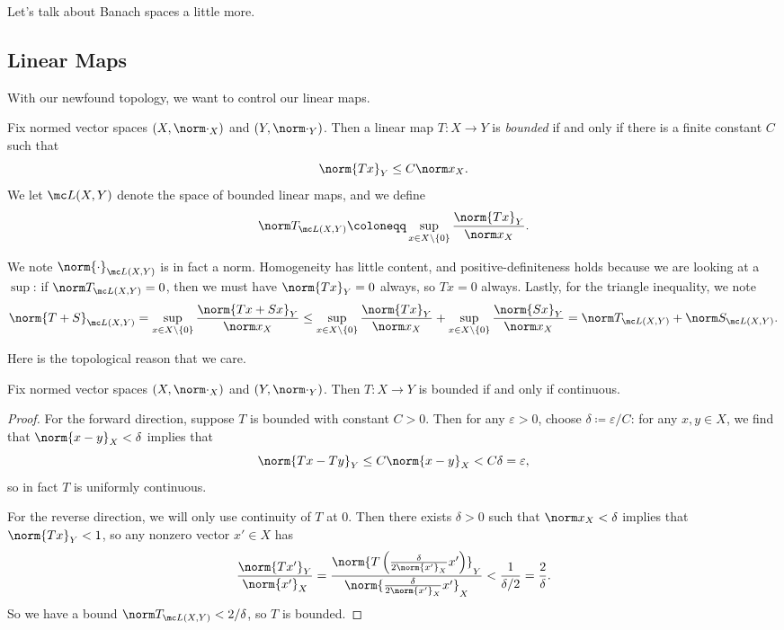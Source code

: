 \documentclass[../notes.tex]{subfiles}
\begin{document}
Let's talk about Banach spaces a little more.

\subsection{Linear Maps}
With our newfound topology, we want to control our linear maps.
\begin{definition}[bounded]
	Fix normed vector spaces $(X,\norm\cdot_X)$ and $(Y,\norm\cdot_Y)$. Then a linear map $T\colon X\to Y$ is \textit{bounded} if and only if there is a finite constant $C$ such that
	\[\norm{Tx}_Y\le C\norm x_X.\]
	We let $\mc L(X,Y)$ denote the space of bounded linear maps, and we define
	\[\norm T_{\mc L(X,Y)}\coloneqq\sup_{x\in X\setminus\{0\}}\frac{\norm {Tx}_Y}{\norm x_X}.\]
\end{definition}
\begin{remark}
	We note $\norm{\cdot}_{\mc L(X,Y)}$ is in fact a norm. Homogeneity has little content, and positive-definite\-ness holds because we are looking at a $\sup$: if $\norm T_{\mc L(X,Y)}=0$, then we must have $\norm{Tx}_Y=0$ always, so $Tx=0$ always. Lastly, for the triangle inequality, we note
	\[\norm{T+S}_{\mc L(X,Y)}=\sup_{x\in X\setminus\{0\}}\frac{\norm {Tx+Sx}_Y}{\norm x_X}\le\sup_{x\in X\setminus\{0\}}\frac{\norm {Tx}_Y}{\norm x_X}+\sup_{x\in X\setminus\{0\}}\frac{\norm {Sx}_Y}{\norm x_X}=\norm T_{\mc L(X,Y)}+\norm S_{\mc L(X,Y)}.\]
\end{remark}
Here is the topological reason that we care.
\begin{lemma} \label{lem:cont-is-bounded}
	Fix normed vector spaces $(X,\norm\cdot_X)$ and $(Y,\norm\cdot_Y)$. Then $T\colon X\to Y$ is bounded if and only if continuous.
\end{lemma}
\begin{proof}
	For the forward direction, suppose $T$ is bounded with constant $C>0$. Then for any $\varepsilon>0$, choose $\delta\coloneqq\varepsilon/C$: for any $x,y\in X$, we find that $\norm{x-y}_X<\delta$ implies that
	\[\norm{Tx-Ty}_Y\le C\norm{x-y}_X<C\delta=\varepsilon,\]
	so in fact $T$ is uniformly continuous.
	
	For the reverse direction, we will only use continuity of $T$ at $0$. Then there exists $\delta>0$ such that $\norm x_X<\delta$ implies that $\norm{Tx}_Y<1$, so any nonzero vector $x'\in X$ has
	\[\frac{\norm{Tx'}_Y}{\norm {x'}_X}=\frac{\norm{T\left(\frac{\delta}{2\norm{x'}_X}x'\right)}_Y}{\norm{\frac{\delta}{2\norm{x'}_X}x'}_X}<\frac1{\delta/2}=\frac2\delta.\]
	So we have a bound $\norm T_{\mc L(X,Y)}<2/\delta$, so $T$ is bounded.
\end{proof}
\end{document}
